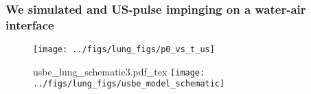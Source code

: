 \begin{frame}\frametitle{\vspace*{0.5cm}We simulated and US-pulse impinging on a water-air interface}
  \begin{minipage}{0.62\textwidth}
    \begin{minipage}{\textwidth}
      \begin{figure}
        \centering
        \texttt{[image: ../figs/lung\_figs/p0\_vs\_t\_us]}%
      \end{figure}
    \end{minipage}
    \begin{minipage}{\textwidth}
      \begin{figure}
        \centering {} {\footnotesize
          {usbe_lung_schematic3.pdf_tex}
          \hfill%
        }
        \texttt{[image: ../figs/lung\_figs/usbe\_model\_schematic]}
      \end{figure}
    \end{minipage}
  \end{minipage}
  \hfill
  \begin{minipage}{0.36\textwidth}
  \end{minipage}
\end{frame}
